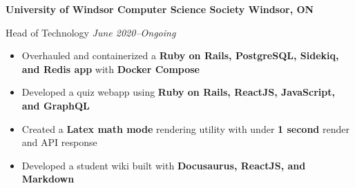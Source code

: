 \textbf{University of Windsor Computer Science Society \hfill Windsor, ON}

Head of Technology \hfill \textit{June 2020--Ongoing}
\begin{itemize}
    \item Overhauled and containerized a \textbf{Ruby on Rails, PostgreSQL, Sidekiq, and Redis app} with \textbf{Docker Compose}
    \item Developed a quiz webapp using \textbf{Ruby on Rails, ReactJS, JavaScript, and GraphQL}
    \item Created a \textbf{Latex math mode} rendering utility with under \textbf{1 second} render and API response
    \item Developed a student wiki built with \textbf{Docusaurus, ReactJS, and Markdown}
\end{itemize}
